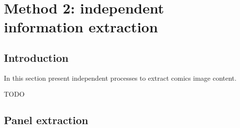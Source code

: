 \chapter{Method 2: independent information extraction}
\label{chap:independent}
\graphicspath{{./chapters/4-independent/figs/}}

\section{Introduction}
\label{sec:in:intro}

In this section present independent processes to extract comics image content.

TODO

\section{Panel extraction}
\label{sec:in:panel_extraction}


